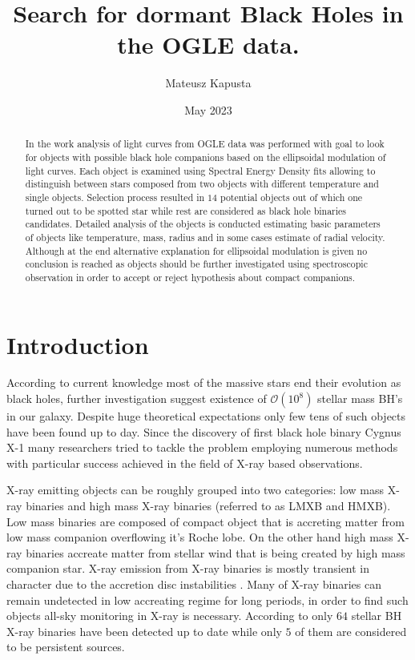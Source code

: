 \documentclass{pracalicmgr}
\author{Mateusz Kapusta}
\title{Search for dormant Black Holes in the OGLE data.}
\date{May 2023}
\begin{document}
    \maketitle
    \let\cleardoublepage\clearpage
\begin{abstract}
    In the work analysis of light curves from OGLE data was performed with goal to look for objects with possible black hole companions based on the 
    ellipsoidal modulation of light curves. Each object is examined using Spectral Energy Density fits allowing to distinguish between stars 
    composed from two objects with different temperature and single objects. Selection process resulted in $14$ potential objects out of which 
    one turned out to be spotted star while rest are considered as black hole binaries candidates. Detailed analysis of the objects is conducted 
    estimating basic parameters of objects like temperature, mass, radius and in some cases estimate of radial velocity. Although at the end 
    alternative explanation for ellipsoidal modulation is given no conclusion is reached as objects should be further investigated using 
    spectroscopic observation in order to accept or reject hypothesis about compact companions.
\end{abstract}

\tableofcontents

\chapter{Introduction}
\hspace{1cm} According to current knowledge most of the massive stars end their evolution as black holes, further investigation suggest existence of $\mathcal{O}(10^8)$ 
stellar mass BH's \citep{brown_scenario_1994} in our galaxy. Despite huge theoretical expectations only few tens of such objects have been found up to day.
Since the discovery of first black hole binary Cygnus X-1 many researchers tried to tackle the problem employing numerous methods with particular
success achieved in the field of X-ray based observations.

\hspace{1cm} X-ray emitting objects can be roughly grouped into two categories: low mass X-ray binaries and high mass X-ray binaries (referred to  as LMXB and HMXB).
Low mass binaries are composed of compact object that is accreting matter from low mass companion overflowing it's Roche lobe. On the other hand 
high mass X-ray binaries accreate matter from stellar wind that is being created by high mass companion star.
X-ray emission from X-ray binaries is mostly transient in character \citep{bambi_transient_2016}
due to the accretion disc instabilities \citep{lasota_disc_2001}. Many of X-ray binaries can remain undetected in low accreating 
regime for long periods, in order to find such objects all-sky monitoring in X-ray is necessary. According to \citet{corral-santana_blackcat_2016} 
only $64$ stellar BH X-ray binaries have been detected  up to date while only $5$ of them are considered to be persistent sources. 
\end{document}
